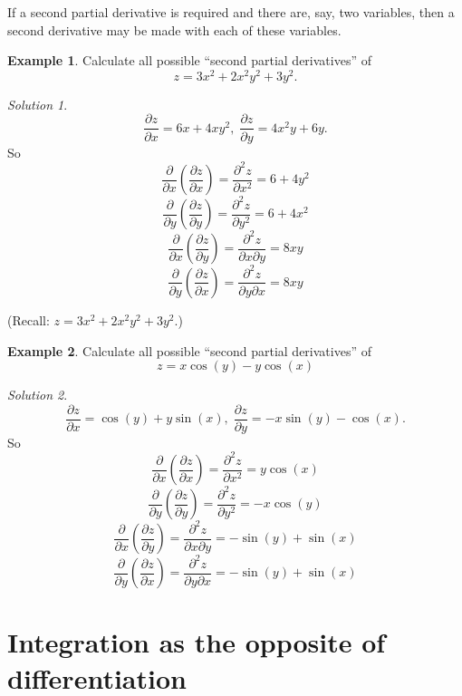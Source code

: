 \documentclass[
  11pt,
  oneside]{book}
\newcommand{\slide}{}
\theoremstyle{definition}
\theoremstyle{definition}
\newtheorem{example}{Example}[chapter]
\theoremstyle{definition}
\theoremstyle{definition}
\theoremstyle{remark}
\newtheorem*{solution}{Solution}
\begin{document}
If a second partial derivative is required and there are, say, two variables, then a second derivative may be made with each of these variables.

\begin{example}
Calculate all possible ``second partial derivatives'' of
\[
z=3x^2+2x^2y^2+3y^2.
\]
\end{example}

\begin{solution}
\[
\frac{\partial z}{\partial x} = 6x+4xy^2,\;\frac{\partial z}{\partial y} = 4x^2y+6y.
\]
So
\[
\frac{\partial}{\partial x}\left(\frac{\partial z}{\partial x}\right) = \frac{\partial^2 z}{\partial x^2} = 6+4y^2
\]
\[
\frac{\partial}{\partial y}\left(\frac{\partial z}{\partial y}\right) = \frac{\partial^2 z}{\partial y^2} = 6+4x^2
\]
\[
\frac{\partial}{\partial x}\left(\frac{\partial z}{\partial y}\right) = \frac{\partial^2 z}{\partial x\partial y} = 8xy
\]
\[
\frac{\partial}{\partial y}\left(\frac{\partial z}{\partial x}\right) = \frac{\partial^2 z}{\partial y\partial x} = 8xy
\]
\end{solution}

\begin{slidesonly}

\slide

(Recall: \(z=3x^2+2x^2y^2+3y^2\).)
\slide

\end{slidesonly}

\begin{example}
Calculate all possible ``second partial derivatives'' of
\[
z = x\cos(y)-y\cos(x)
\]
\end{example}

\begin{solution}
\[
\frac{\partial z}{\partial x} = \cos(y)+y\sin(x),\;\frac{\partial z}{\partial y} = -x\sin(y)-\cos(x).
\]
So
\[
\frac{\partial}{\partial x}\left(\frac{\partial z}{\partial x}\right) = \frac{\partial^2 z}{\partial x^2} = y\cos(x)
\]
\[
\frac{\partial}{\partial y}\left(\frac{\partial z}{\partial y}\right) = \frac{\partial^2 z}{\partial y^2} = -x\cos(y)
\]
\[
\frac{\partial}{\partial x}\left(\frac{\partial z}{\partial y}\right) = \frac{\partial^2 z}{\partial x\partial y} = -\sin(y)+\sin(x)
\]
\[
\frac{\partial}{\partial y}\left(\frac{\partial z}{\partial x}\right) = \frac{\partial^2 z}{\partial y\partial x} = -\sin(y)+\sin(x)
\]
\end{solution}

\slide

\section{Integration as the opposite of differentiation}\label{integration-as-the-opposite-of-differentiation}
\end{document}
